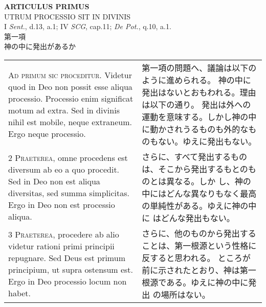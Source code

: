 \documentclass[10pt]{jsarticle} %
\begin{document}
\begin{longtable}{p{21em}p{21em}}
\end{longtable}

\newpage


\begin{center}
 {\Large {\bf ARTICULUS PRIMUS}}\\
 {\large UTRUM PROCESSIO SIT IN DIVINIS}\\
 {\footnotesize I {\itshape Sent.}, d.13, a.1; IV {\itshape SCG},
 cap.11; {\itshape De Pot.}, q.10, a.1.}\\
 {\Large 第一項\\神の中に発出があるか}
\end{center}

\begin{longtable}{p{21em}p{21em}}


{\Huge A}{\scshape d primum sic proceditur}. Videtur quod in Deo non possit esse aliqua
processio. Processio enim significat motum ad extra. Sed in divinis
nihil est mobile, neque extraneum. Ergo neque processio.


&

第一項の問題へ、議論は以下のように進められる。
神の中に発出はないとおもわれる。理由は以下の通り。
発出は外への運動を意味する。しかし神の中に動かされうるものも外的なも
 のもない。ゆえに発出もない。

\\



2 {\scshape Praeterea}, omne procedens est diversum ab eo a quo procedit. Sed in Deo
non est aliqua diversitas, sed summa simplicitas. Ergo in Deo non est
processio aliqua.


&

さらに、すべて発出するものは、そこから発出するもとのものとは異なる。しか
 し、神の中にはどんな異なりもなく最高の単純性がある。ゆえに神の中に
 はどんな発出もない。

\\



3 {\scshape Praeterea}, procedere ab alio videtur rationi primi principii
repugnare. Sed Deus est primum principium, ut supra ostensum est. Ergo
in Deo processio locum non habet.


&

さらに、他のものから発出することは、第一根源という性格に反すると思われる。
 ところが前に示されたとおり、神は第一根源である。ゆえに神の中に発出
 の場所はない。

\\



\end{longtable}
\end{document}
